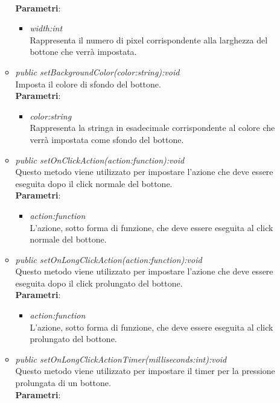 \begin{itemize}
\begin{itemize}
		\\ \textbf{Parametri}: \begin{itemize}
		\item \textit{width:int}\\
		Rappresenta il numero di pixel corrispondente alla larghezza del bottone che verrà impostata.
		\end{itemize}
	\item \textit{public setBackgroundColor(color:string):void}\\
	Imposta il colore di sfondo del bottone.
		\\ \textbf{Parametri}: \begin{itemize}
		\item \textit{color:string}\\
		Rappresenta la stringa in esadecimale corrispondente al colore che verrà impostata come sfondo del bottone.
		\end{itemize}
	\item \textit{public setOnClickAction(action:function):void}\\
	Questo metodo viene utilizzato per impostare l'azione che deve essere eseguita dopo il click normale del bottone.
		\\ \textbf{Parametri}: \begin{itemize}
		\item \textit{action:function}\\
		L'azione, sotto forma di funzione, che deve essere eseguita al click normale del bottone.
		\end{itemize}
	\item \textit{public setOnLongClickAction(action:function):void}\\
		Questo metodo viene utilizzato per impostare l'azione che deve essere eseguita dopo il click prolungato del bottone.
		\\ \textbf{Parametri}: \begin{itemize}
		\item \textit{action:function}\\
		L'azione, sotto forma di funzione, che deve essere eseguita al click prolungato del bottone.
		\end{itemize}
		\item \textit{public setOnLongClickActionTimer(milliseconds:int):void}\\
		Questo metodo viene utilizzato per impostare il timer per la pressione prolungata di un bottone.
				\\ \textbf{Parametri}: \begin{itemize}

\end{itemize}
\end{itemize}
\end{itemize}
